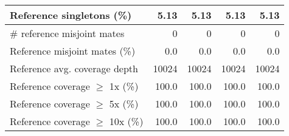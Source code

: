 \documentclass[12pt,a4paper]{article}
\begin{document}
\begin{table}[ht]
\begin{center}
\begin{tabular}{|l*{4}{|r}|}
Reference singletons (\%) & 5.13 & 5.13 & 5.13 & 5.13 \\ \hline
\# reference misjoint mates & 0 & 0 & 0 & 0 \\ \hline
Reference misjoint mates (\%) & 0.0 & 0.0 & 0.0 & 0.0 \\ \hline
Reference avg. coverage depth & 10024 & 10024 & 10024 & 10024 \\ \hline
Reference coverage $\geq$ 1x (\%) & 100.0 & 100.0 & 100.0 & 100.0 \\ \hline
Reference coverage $\geq$ 5x (\%) & 100.0 & 100.0 & 100.0 & 100.0 \\ \hline
Reference coverage $\geq$ 10x (\%) & 100.0 & 100.0 & 100.0 & 100.0 \\ \hline
\end{tabular}
\end{center}
\end{table}
\end{document}
